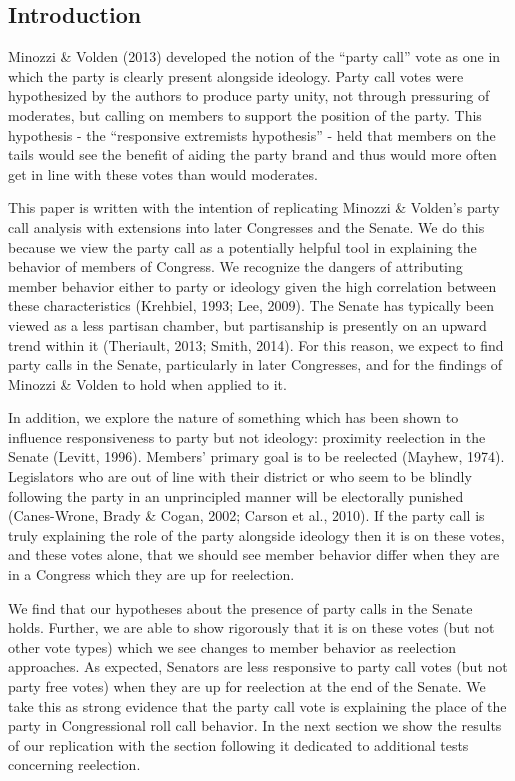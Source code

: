 \documentclass[12pt]{article}
\begin{document}
\subsection{Introduction}

Minozzi \& Volden (2013) developed the notion of the ``party call'' vote as one in which the party is clearly present alongside ideology. Party call votes were hypothesized by the authors to produce party unity, not through pressuring of moderates, but calling on members to support the position of the party. This hypothesis - the ``responsive extremists hypothesis'' - held that members on the tails would see the benefit of aiding the party brand and thus would more often get in line with these votes than would moderates.

This paper is written with the intention of replicating Minozzi \& Volden's party call analysis with extensions into later Congresses and the Senate. We do this because we view the party call as a potentially helpful tool in explaining the behavior of members of Congress. We recognize the dangers of attributing member behavior either to party or ideology given the high correlation between these characteristics (Krehbiel, 1993; Lee, 2009). The Senate has typically been viewed as a less partisan chamber, but partisanship is presently on an upward trend within it (Theriault, 2013; Smith, 2014). For this reason, we expect to find party calls in the Senate, particularly in later Congresses, and for the findings of Minozzi \& Volden to hold when applied to it.

In addition, we explore the nature of something which has been shown to influence responsiveness to party but not ideology: proximity reelection in the Senate (Levitt, 1996). Members' primary goal is to be reelected (Mayhew, 1974). Legislators who are out of line with their district or who seem to be blindly following the party in an unprincipled manner will be electorally punished (Canes-Wrone, Brady \& Cogan, 2002; Carson et al., 2010). If the party call is truly explaining the role of the party alongside ideology then it is on these votes, and these votes alone, that we should see member behavior differ when they are in a Congress which they are up for reelection. 

We find that our hypotheses about the presence of party calls in the Senate holds. Further, we are able to show rigorously that it is on these votes (but not other vote types) which we see changes to member behavior as reelection approaches. As expected, Senators are less responsive to party call votes (but not party free votes) when they are up for reelection at the end of the Senate. We take this as strong evidence that the party call vote is explaining the place of the party in Congressional roll call behavior. In the next section we show the results of our replication with the section following it dedicated to additional tests concerning reelection.
\end{document}
